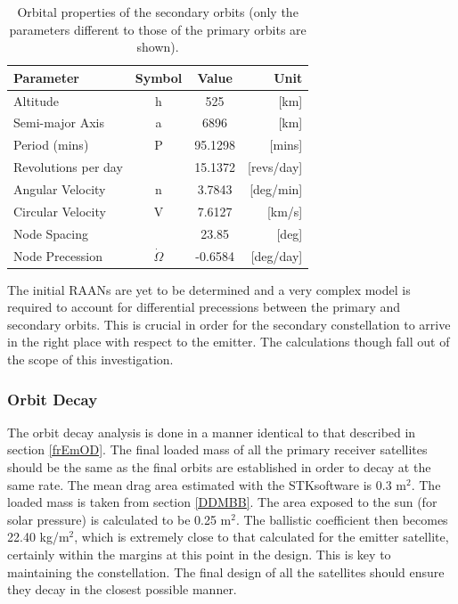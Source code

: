 \begin{table}[ht!]
\begin{centering}
\begin{tabular}{lccr}
\toprule
Parameter				&			Symbol			&			Value			&			Unit \\
\hline \hline
Altitude				&			h						&			525			&			[km]	 \\
Semi-major Axis	&			a						&			6896			&			[km]	 \\
Period (mins)		&			P						&			95.1298	&			[mins]	 \\
Revolutions per day		&									&			15.1372	&			[revs/day]	 \\
Angular Velocity		&			n						&			3.7843	&			[deg/min]	 \\
Circular Velocity		&			V						&			7.6127	&			[km/s]	 \\
Node Spacing	&			 						&			23.85	&			[deg]	 \\
Node Precession	&			 $\dot{\Omega}$					&			-0.6584	&			[deg/day]	 \\
\bottomrule
\end{tabular}
\caption{Orbital properties of the secondary orbits (only the parameters different to those of the primary orbits are shown).}
\label{table:orbsecref}
\end{centering}
\end{table}

The initial RAANs are yet to be determined and a very complex model is required to account for differential precessions between the primary and secondary orbits. This is crucial in order for the secondary constellation to arrive in the right place with respect to the emitter. The calculations though fall out of the scope of this investigation.

\subsubsection{Orbit Decay}
\label{frRecOD}

The orbit decay analysis is done in a manner identical to that described in section \ref{frEmOD}. The final loaded mass of all the primary receiver satellites should be the same as the final orbits are established in order to decay at the same rate. The mean drag area estimated with the STK\texttrademark software is 0.3 m$^2$. The loaded mass is taken from section \ref{DDMBB}. The area exposed to the sun (for solar pressure) is calculated to be 0.25 m$^2$. The ballistic coefficient then becomes 22.40 kg/m$^2$, which is extremely close to that calculated for the emitter satellite, certainly within the margins at this point in the design. This is key to maintaining the constellation. The final design of all the satellites should ensure they decay in the closest possible manner.

